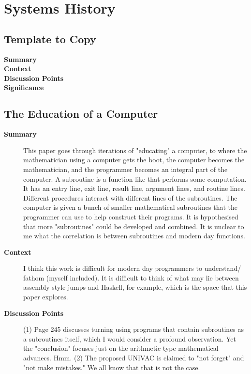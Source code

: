 \chapter {Systems History}

\section {Template to Copy}

\begin{description}
    \item[\textbf{Summary}]
    \item[\textbf{Context}]
    \item[\textbf{Discussion Points}]
    \item[\textbf{Significance}]
\end{description}

\section {The Education of a Computer \cite{hopper1952education}}

\begin{description}
    \item[\textbf{Summary}] This paper goes through iterations of "educating"
    a computer, to where the mathematician using a computer gets the boot, the
    computer becomes the mathematician, and the programmer becomes an integral
    part of the computer. A subroutine is a function-like that performs some
    computation. It has an entry line, exit line, result line, argument lines,
    and routine lines. Different procedures interact with different lines of the
    subroutines. The computer is given a bunch of smaller mathematical subroutines
    that the programmer can use to help construct their programs. It is
    hypothesised that more "subroutines" could be developed and combined. It is
    unclear to me what the correlation is between subroutines and modern day
    functions.
    \item[\textbf{Context}] I think this work is difficult for modern day 
    programmers to understand/ fathom (myself included). It is difficult to
    think of what may lie between assembly-style jumps and Haskell, for example,
     which is the space that this paper explores.
    \item[\textbf{Discussion Points}] (1) Page 245 discusses turning using
    programs that contain subroutines as a subroutines itself, which I would
    consider a profound observation. Yet the "conclusion" focuses just on the
    arithmetic type mathematical advanecs. Hmm.
    (2) The proposed UNIVAC is claimed to "not forget" and "not make mistakes."
    We all know that that is not the case.
\end{description}

